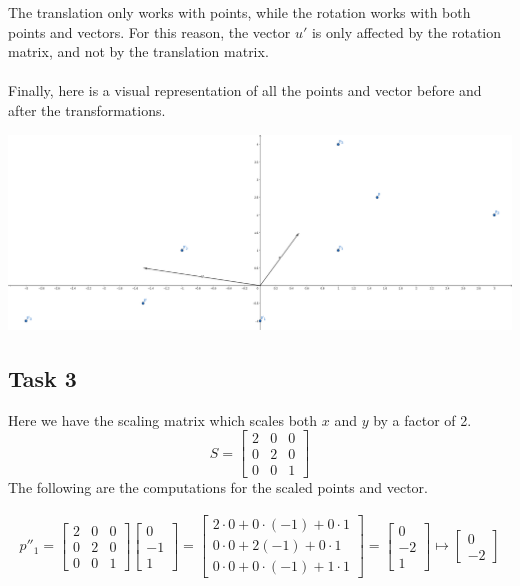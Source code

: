 \documentclass{article}
\begin{document}
The translation only works with points, while the rotation works with both points and vectors. For this reason, the vector $u'$ is only affected by the rotation matrix, and not by the translation matrix. \\ \\
Finally, here is a visual representation of all the points and vector before and after the transformations. \\

\begin{center}
	\includegraphics[width=15cm]{task_2.png}
\end{center}

\subsection{Task 3}
Here we have the scaling matrix which scales both $x$ and $y$ by a factor of 2.
\[ S = \begin{bmatrix} 2 & 0 & 0 \\ 0 & 2 & 0 \\ 0 & 0 & 1 \end{bmatrix} \]
The following are the computations for the scaled points and vector.

\begin{align*}
	p''_1 = \begin{bmatrix}2&0&0\\ 0&2&0\\ 0&0&1\end{bmatrix}\begin{bmatrix}0\\ -1\\ 1\end{bmatrix} = \begin{bmatrix}2\cdot 0+0\cdot \left(-1\right)+0\cdot 1\\ 0\cdot 0+2\left(-1\right)+0\cdot 1\\ 0\cdot 0+0\cdot \left(-1\right)+1\cdot 1\end{bmatrix} = \begin{bmatrix}0\\ -2\\ 1\end{bmatrix} \mapsto \begin{bmatrix}0\\ -2\end{bmatrix}
\end{align*}
\end{document}
